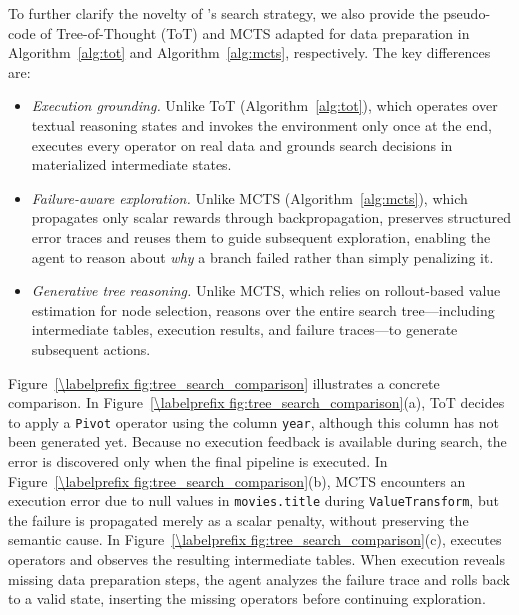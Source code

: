 To further clarify the novelty of \sys's search strategy, we also provide the pseudo-code of Tree-of-Thought (ToT) and MCTS adapted for data preparation in Algorithm~\ref{alg:tot} and Algorithm~\ref{alg:mcts}, respectively. The key differences are:

\begin{itemize}[leftmargin=*]
    \item \emph{Execution grounding.} Unlike ToT (Algorithm~\ref{alg:tot}), which operates over textual reasoning states and invokes the environment only once at the end, \sys executes every operator on real data and grounds search decisions in materialized intermediate states.
    \item \emph{Failure-aware exploration.} Unlike MCTS (Algorithm~\ref{alg:mcts}), which propagates only scalar rewards through backpropagation, \sys preserves structured error traces and reuses them to guide subsequent exploration, enabling the agent to reason about \emph{why} a branch failed rather than simply penalizing it.
    \item \emph{Generative tree reasoning.} Unlike MCTS, which relies on rollout-based value estimation for node selection, \sys reasons over the entire search tree---including intermediate tables, execution results, and failure traces---to generate subsequent actions.
\end{itemize}



Figure~\ref{\labelprefix fig:tree_search_comparison} illustrates a concrete comparison. In Figure~\ref{\labelprefix fig:tree_search_comparison}(a), ToT decides to apply a \texttt{Pivot} operator using the column \texttt{year}, although this column has not been generated yet. Because no execution feedback is available during search, the error is discovered only when the final pipeline is executed. In Figure~\ref{\labelprefix fig:tree_search_comparison}(b), MCTS encounters an execution error due to null values in \texttt{movies.title} during \texttt{ValueTransform}, but the failure is propagated merely as a scalar penalty, without preserving the semantic cause. In Figure~\ref{\labelprefix fig:tree_search_comparison}(c), \sys executes operators and observes the resulting intermediate tables. When execution reveals missing data preparation steps, the agent analyzes the failure trace and rolls back to a valid state, inserting the missing operators before continuing exploration.
